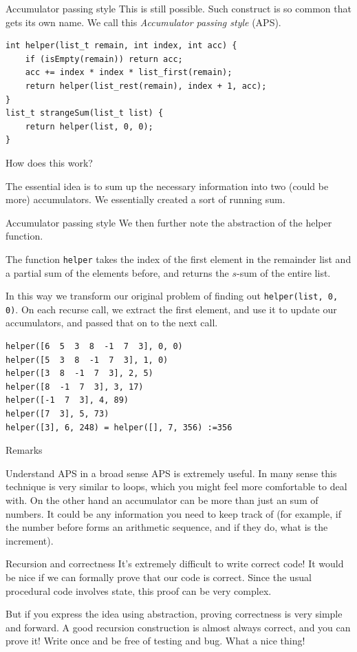 \begin{frame}[fragile]{Accumulator passing style}
This is still possible. Such construct is so common that gets its own name. We call this \textit{Accumulator passing style} (APS). 

\begin{verbatim}
int helper(list_t remain, int index, int acc) {
    if (isEmpty(remain)) return acc;
    acc += index * index * list_first(remain);
    return helper(list_rest(remain), index + 1, acc);
}
list_t strangeSum(list_t list) { 
    return helper(list, 0, 0); 
}
\end{verbatim}

How does this work? 

The essential idea is to sum up the necessary information into two (could be more) accumulators. We essentially created a sort of running sum.
\end{frame}

\begin{frame}[fragile]{Accumulator passing style}
We then further note the abstraction of the helper function.

The function \texttt{helper} takes the index of the first element in the remainder list and a partial sum of the elements before, and returns the $s$-sum of the entire list.

In this way we transform our original problem of finding out \texttt{helper(list, 0, 0)}. On each recurse call, we extract the first element, and use it to update our accumulators, and passed that on to the next call. 

\begin{verbatim}
helper([6  5  3  8  -1  7  3], 0, 0)
helper([5  3  8  -1  7  3], 1, 0)
helper([3  8  -1  7  3], 2, 5)
helper([8  -1  7  3], 3, 17)
helper([-1  7  3], 4, 89)
helper([7  3], 5, 73)
helper([3], 6, 248) = helper([], 7, 356) :=356
\end{verbatim}
\end{frame}

\begin{frame}{Remarks}
\begin{block}{Understand APS in a broad sense}
	APS is extremely useful. In many sense this technique is very similar to loops, which you might feel more comfortable to deal with. On the other hand an accumulator can be more than just an sum of numbers. It could be any information you need to keep track of (for example, if the number before forms an arithmetic sequence, and if they do, what is the increment). 
\end{block}

\begin{block}{Recursion and correctness}
	It's extremely difficult to write correct code! It would be nice if we can formally prove that our code is correct. Since the usual procedural code involves state, this proof can be very complex. 
	
	But if you express the idea using abstraction, proving correctness is very simple and forward. A good recursion construction is almost always correct, and you can prove it! Write once and be free of testing and bug. What a nice thing!
\end{block}
\end{frame}